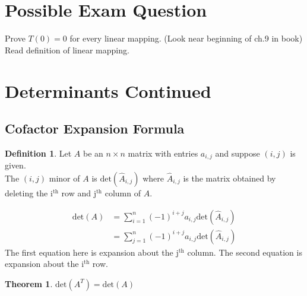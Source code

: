 \documentclass{report}
\theoremstyle{plain}
\newtheorem*{thrm}{Theorem}
\theoremstyle{definition}
\newtheorem*{defn}{Definition}
\theoremstyle{plain}
\begin{document}
\section{Possible Exam Question}
Prove $T(0)=0$ for every linear mapping. (Look near beginning of ch.9 in book) Read definition of linear mapping.

\section{Determinants Continued}
\subsection{Cofactor Expansion Formula}
\begin{defn}
Let $A$ be an $n\times n$ matrix with entries $a_{i,j}$ and suppose $(i,j)$ is given.\\
The $(i,j)$ minor of $A$ is $\mathrm{det}(\hat{A}_{i,j})$ where $\hat{A}_{i,j}$ is the matrix obtained by deleting the i$^{\mathrm{th}}$ row and j$^{\mathrm{th}}$ column of $A$.
\end{defn}

\begin{align*}
\mathrm{det}(A)&=\sum_{i=1}^n(-1)^{i+j}a_{i,j}\mathrm{det}(\hat{A}_{i,j})\\
&= \sum_{j=1}^n(-1)^{i+j}a_{i,j}\mathrm{det}(\hat{A}_{i,j})
\end{align*}
The first equation here is expansion about the j$^{\mathrm{th}}$ column. The second equation is expansion about the i$^{\mathrm{th}}$ row.
\begin{thrm}
$\mathrm{det}(A^T)=\mathrm{det}(A)$
\end{thrm}
\end{document}

